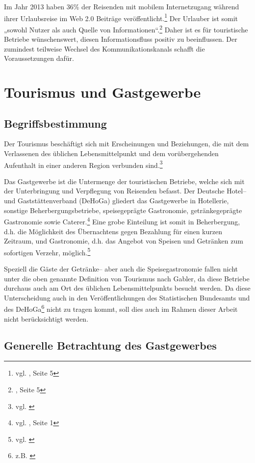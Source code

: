 Im Jahr 2013 haben 36\% der Reisenden mit mobilem Internetzugang während ihrer Urlaubsreise im Web 2.0 Beiträge veröffentlicht.\footnote{vgl. \cite{reiseanalyse}, Seite 5} Der Urlauber ist somit „sowohl Nutzer als auch Quelle von Informationen“.\footnote{\cite{reiseanalyse}, Seite 5} Daher ist es für touristische Betriebe wünschenswert, diesen Informationsfluss positiv zu beeinflussen. Der zumindest teilweise Wechsel des Kommunikationskanals schafft die Voraussetzungen dafür.

\newpage
\section{Tourismus und Gastgewerbe}
\label{sec:tourismusbranche}

\subsection{Begriffsbestimmung}
Der Tourismus beschäftigt sich mit Erscheinungen und Beziehungen, die mit dem Verlassenen des üblichen Lebensmittelpunkt und dem vorübergehenden Aufenthalt in einer anderen Region verbunden sind.\footnote{vgl. \cite{gabler:tourismus}}

Das Gastgewerbe ist die Untermenge der touristischen Betriebe, welche sich mit der Unterbringung und Verpflegung von Reisenden befasst. Der Deutsche Hotel– und Gaststättenverband (\ac{DeHoGa}) gliedert das Gastgewerbe in Hotellerie, sonstige Beherbergungsbetriebe, speisegeprägte Gastronomie, getränkegeprägte Gastronomie sowie Caterer.\footnote{vgl. \cite{dehoga:zahlenspiegel}, Seite 1} Eine grobe Einteilung ist somit in Beherbergung, d.h. die Möglichkeit des Übernachtens gegen Bezahlung für einen kurzen Zeitraum, und Gastronomie, d.h. das Angebot von Speisen und Getränken zum sofortigen Verzehr, möglich.\footnote{vgl. \cite{destatis:gastgewerbe}}

Speziell die Gäste der Getränke-- aber auch die Speisegastronomie fallen nicht unter die oben genannte Definition von Tourismus nach Gabler, da diese Betriebe durchaus auch am Ort des üblichen Lebensmittelpunkts besucht werden. Da diese Unterscheidung auch in den Veröffentlichungen des Statistischen Bundesamts und des \ac{DeHoGa}\footnote{z.B. \cite{dehoga:zahlenspiegel}} nicht zu tragen kommt, soll dies auch im Rahmen dieser Arbeit nicht berücksichtigt werden.

\subsection{Generelle Betrachtung des Gastgewerbes}
\label{sec:generelltouri}

